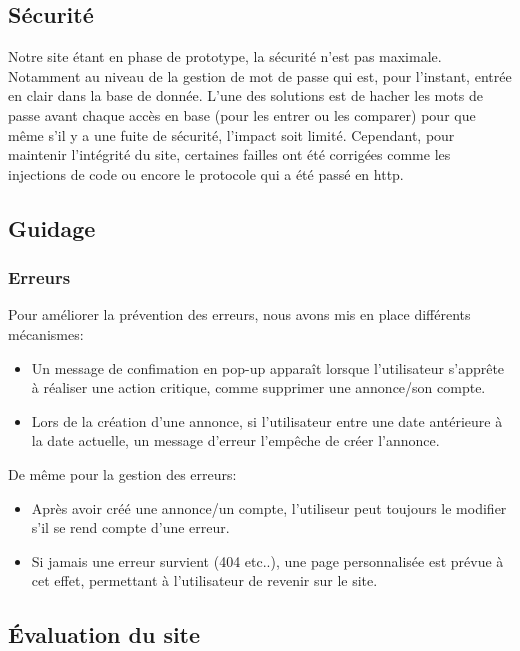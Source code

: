 \documentclass[a4paper,11pt]{article}
\begin{document}
\subsection{Sécurité}
Notre site étant en phase de prototype, la sécurité n'est pas maximale. Notamment au niveau de la gestion de mot de passe qui est, pour l'instant, entrée en clair dans la base de donnée. L'une des solutions est de hacher les mots de passe avant chaque accès en base (pour les entrer ou les comparer) pour que même s'il y a une fuite de sécurité, l'impact soit limité. Cependant, pour maintenir l'intégrité du site, certaines failles ont été corrigées comme les injections de code ou encore le protocole qui a été passé en http.

\subsection{Guidage}
\subsubsection*{Erreurs}
Pour améliorer la prévention des erreurs, nous avons mis en place différents mécanismes:
\begin{itemize}
  \item Un message de confimation en pop-up apparaît lorsque l'utilisateur s'apprête à réaliser une action critique, comme supprimer une annonce/son compte.
  \item Lors de la création d'une annonce, si l'utilisateur entre une date antérieure à la date actuelle, un message d'erreur l'empêche de créer l'annonce.
\end{itemize}

De même pour la gestion des erreurs:
\begin{itemize}
  \item Après avoir créé une annonce/un compte, l'utiliseur peut toujours le modifier s'il se rend compte d'une erreur.
  \item Si jamais une erreur survient (404 etc..), une page personnalisée est prévue à cet effet, permettant à l'utilisateur de revenir sur le site.
\end{itemize}


\subsection{Évaluation du site}
\end{document}
